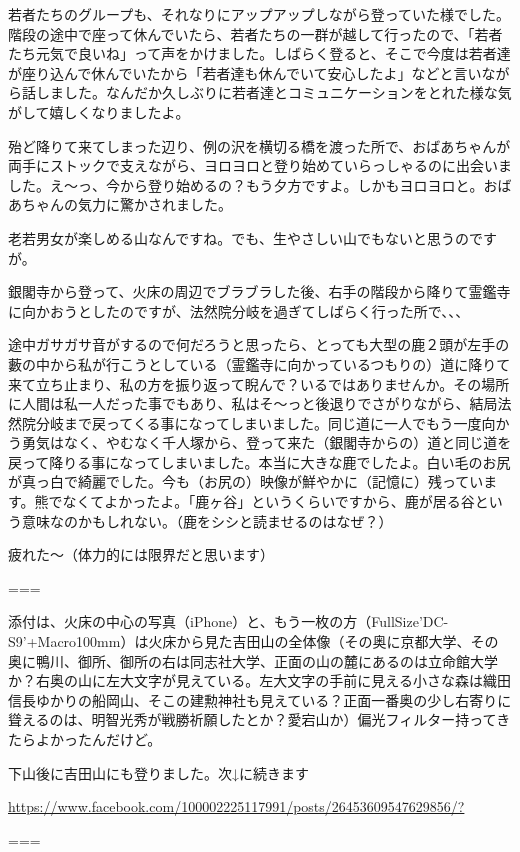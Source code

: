 若者たちのグループも、それなりにアップアップしながら登っていた様でした。階段の途中で座って休んでいたら、若者たちの一群が越して行ったので、「若者たち元気で良いね」って声をかけました。しばらく登ると、そこで今度は若者達が座り込んで休んでいたから「若者達も休んでいて安心したよ」などと言いながら話しました。なんだか久しぶりに若者達とコミュニケーションをとれた様な気がして嬉しくなりましたよ。

殆ど降りて来てしまった辺り、例の沢を横切る橋を渡った所で、おばあちゃんが両手にストックで支えながら、ヨロヨロと登り始めていらっしゃるのに出会いました。え〜っ、今から登り始めるの？もう夕方ですよ。しかもヨロヨロと。おばあちゃんの気力に驚かされました。

老若男女が楽しめる山なんですね。でも、生やさしい山でもないと思うのですが。

銀閣寺から登って、火床の周辺でブラブラした後、右手の階段から降りて霊鑑寺に向かおうとしたのですが、法然院分岐を過ぎてしばらく行った所で、、、

途中ガサガサ音がするので何だろうと思ったら、とっても大型の鹿２頭が左手の藪の中から私が行こうとしている（霊鑑寺に向かっているつもりの）道に降りて来て立ち止まり、私の方を振り返って睨んで？いるではありませんか。その場所に人間は私一人だった事でもあり、私はそ〜っと後退りでさがりながら、結局法然院分岐まで戻ってくる事になってしまいました。同じ道に一人でもう一度向かう勇気はなく、やむなく千人塚から、登って来た（銀閣寺からの）道と同じ道を戻って降りる事になってしまいました。本当に大きな鹿でしたよ。白い毛のお尻が真っ白で綺麗でした。今も（お尻の）映像が鮮やかに（記憶に）残っています。熊でなくてよかったよ。「鹿ヶ谷」というくらいですから、鹿が居る谷という意味なのかもしれない。（鹿をシシと読ませるのはなぜ？）

疲れた〜（体力的には限界だと思います）

===

添付は、火床の中心の写真（iPhone）と、もう一枚の方（FullSize’DC-S9’+Macro100mm）は火床から見た吉田山の全体像（その奥に京都大学、その奥に鴨川、御所、御所の右は同志社大学、正面の山の麓にあるのは立命館大学か？右奥の山に左大文字が見えている。左大文字の手前に見える小さな森は織田信長ゆかりの船岡山、そこの建勲神社も見えている？正面一番奥の少し右寄りに聳えるのは、明智光秀が戦勝祈願したとか？愛宕山か）偏光フィルター持ってきたらよかったんだけど。

下山後に吉田山にも登りました。次↓に続きます

\url{https://www.facebook.com/100002225117991/posts/26453609547629856/?}

===

